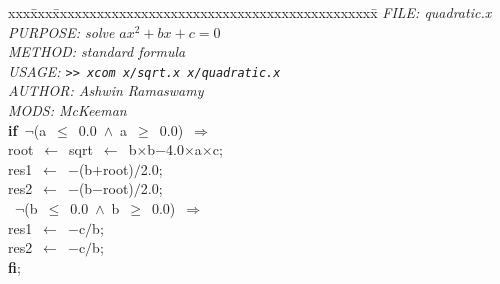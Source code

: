 \documentclass{report}
\begin{document}
\pagestyle{empty}
\begin{tabbing}
xxx\=xxx\=xxxxxxxxxxxxxxxxxxxxxxxxxxxxxxxxxxxxxxxxxxxx\=\kill
{\tt{}}{\em{} FILE:    quadratic.x}\\
{\tt{}}{\em{} PURPOSE: solve $ax^2+bx+c=0$}\\
{\tt{}}{\em{} METHOD:  standard formula}\\
{\tt{}}{\em{} USAGE:   \verb!>> xcom x/sqrt.x x/quadratic.x!}\\
{\tt{}}{\em{} AUTHOR:  Ashwin Ramaswamy}\\
{\tt{}}{\em{} MODS:    McKeeman}\\
{\bf if}\>\ $\neg$(a\ $\leq$\ 0.0\ $\wedge$\ a\ $\geq$\ 0.0)\ $\Rightarrow$
\>\\
\>root\ $\leftarrow$\ sqrt\ $\leftarrow$\ b$\times$b$-$4.0$\times$a$\times$c;\\
\>res1\ $\leftarrow$\ $-$(b$+$root)$/$2.0;\\
\>res2\ $\leftarrow$\ $-$(b$-$root)$/$2.0;\\
\raisebox{2pt}{\ \ \framebox[2pt]{\rule{0pt}{1pt}}}
\>\ $\neg$(b\ $\leq$\ 0.0\ $\wedge$\ b\ $\geq$\ 0.0)\ $\Rightarrow$
\>\\
\>res1\ $\leftarrow$\ $-$c$/$b;\\
\>res2\ $\leftarrow$\ $-$c$/$b;\\
{\bf {f}{i}};
\\
\end{tabbing}
\end{document}
